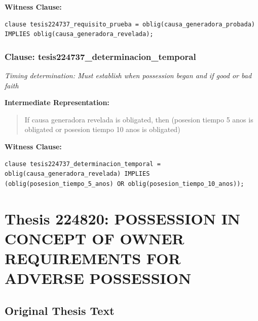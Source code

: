 \documentclass[11pt,a4paper]{article}
\begin{document}
\textbf{Witness Clause:}

\begin{lstlisting}[style=witnessstyle, language=Witness]
clause tesis224737_requisito_prueba = oblig(causa_generadora_probada) IMPLIES oblig(causa_generadora_revelada);
\end{lstlisting}

\subsubsection{Clause: tesis224737\_determinacion\_temporal}

\textit{Timing determination: Must establish when possession began and if good or bad faith}

\textbf{Intermediate Representation:}

\begin{quote}
If causa generadora revelada is obligated, then (posesion tiempo 5 anos is obligated or posesion tiempo 10 anos is obligated)
\end{quote}

\textbf{Witness Clause:}

\begin{lstlisting}[style=witnessstyle, language=Witness]
clause tesis224737_determinacion_temporal = oblig(causa_generadora_revelada) IMPLIES (oblig(posesion_tiempo_5_anos) OR oblig(posesion_tiempo_10_anos));
\end{lstlisting}

\newpage

\section{Thesis 224820: POSSESSION IN CONCEPT OF OWNER REQUIREMENTS FOR ADVERSE POSSESSION}
\label{thesis:224820}

\subsection{Original Thesis Text}
\end{document}

